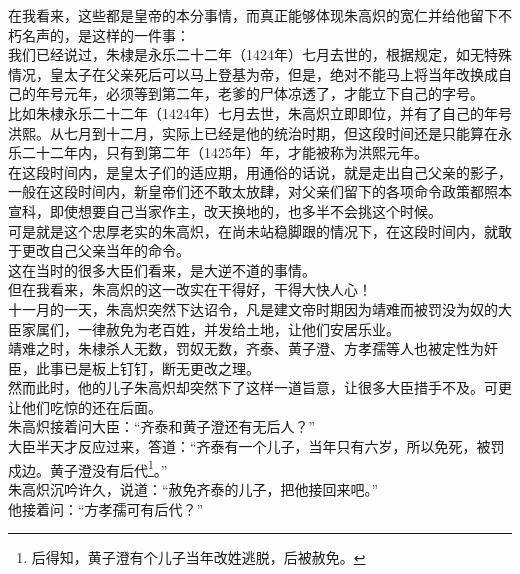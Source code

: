 \begin{multicols}{\theparacolNo}
在我看来，这些都是皇帝的本分事情，而真正能够体现朱高炽的宽仁并给他留下不朽名声的，是这样的一件事：\\

我们已经说过，朱棣是永乐二十二年（1424年）七月去世的，根据规定，如无特殊情况，皇太子在父亲死后可以马上登基为帝，但是，绝对不能马上将当年改换成自己的年号元年，必须等到第二年，老爹的尸体凉透了，才能立下自己的字号。\\

比如朱棣永乐二十二年（1424年）七月去世，朱高炽立即即位，并有了自己的年号洪熙。从七月到十二月，实际上已经是他的统治时期，但这段时间还是只能算在永乐二十二年内，只有到第二年（1425年）年，才能被称为洪熙元年。\\

在这段时间内，是皇太子们的适应期，用通俗的话说，就是走出自己父亲的影子，一般在这段时间内，新皇帝们还不敢太放肆，对父亲们留下的各项命令政策都照本宣科，即使想要自己当家作主，改天换地的，也多半不会挑这个时候。\\

可是就是这个忠厚老实的朱高炽，在尚未站稳脚跟的情况下，在这段时间内，就敢于更改自己父亲当年的命令。\\

这在当时的很多大臣们看来，是大逆不道的事情。\\

但在我看来，朱高炽的这一改实在干得好，干得大快人心！\\

十一月的一天，朱高炽突然下达诏令，凡是建文帝时期因为靖难而被罚没为奴的大臣家属们，一律赦免为老百姓，并发给土地，让他们安居乐业。\\

靖难之时，朱棣杀人无数，罚奴无数，齐泰、黄子澄、方孝孺等人也被定性为奸臣，此事已是板上钉钉，断无更改之理。\\

然而此时，他的儿子朱高炽却突然下了这样一道旨意，让很多大臣措手不及。可更让他们吃惊的还在后面。\\

朱高炽接着问大臣：“齐泰和黄子澄还有无后人？”\\

大臣半天才反应过来，答道：“齐泰有一个儿子，当年只有六岁，所以免死，被罚戍边。黄子澄没有后代\footnote{后得知，黄子澄有个儿子当年改姓逃脱，后被赦免。}。”\\

朱高炽沉吟许久，说道：“赦免齐泰的儿子，把他接回来吧。”\\

他接着问：“方孝孺可有后代？”\\


\end{multicols}
